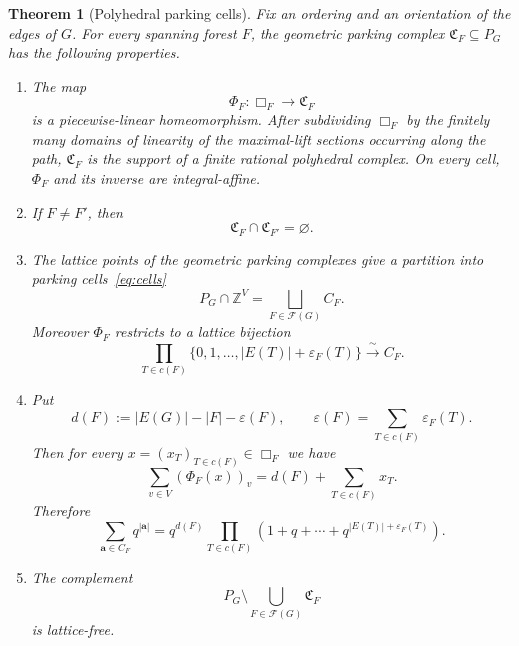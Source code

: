 \documentclass[10pt,a4paper]{amsart}
\newtheorem{theorem}{Theorem}
\newcommand{\ZZ}{\mathbb Z}
\newcommand{\ba}{\mathbf{a}}
\newcommand{\cF}{\mathcal{F}}    %
\newcommand{\eps}{\varepsilon}
\newcommand{\fC}{\mathfrak C}    %
\renewcommand{\mathcal}{\mathscr}
\begin{document}
\begin{theorem}
  [Polyhedral parking cells]
  \label{thm:polyhedral-parking-cells} Fix an ordering and an orientation of the edges of $G$.
For every spanning
forest $F$, the geometric parking complex $\fC_F\subseteq P_G$ has the following properties.
\begin{enumerate}
\item[(i)] The map
\[
   \Phi_F:\Box_F\longrightarrow\fC_F
\]
is a piecewise-linear homeomorphism.  After subdividing $\Box_F$ by
the finitely many domains of linearity of the maximal-lift sections occurring  along the path,
$\fC_F$ is the support of a finite rational polyhedral complex.
On every cell, $\Phi_F$ and its inverse are integral-affine.

\item[(ii)] If $F\ne F'$, then
\begin{equation}
   \fC_F\cap\fC_{F'}=\varnothing.
\label{eq:geometric-cells-disjoint}
\end{equation}

\item[(iii)] The lattice points of the geometric parking complexes give a partition into parking cells~\eqref{eq:cells}
\begin{equation}
   P_G\cap\ZZ^V
   =\bigsqcup_{F\in\cF(G)}C_F.
\label{eq:parking-lattice-partition}
\end{equation}
Moreover $\Phi_F$ restricts to a lattice bijection
\begin{equation}
   \prod_{T\in c(F)}
      \{0,1,\ldots,|E(T)|+\eps_F(T)\}
   \xrightarrow{\ \sim\ } C_F.
\label{eq:parking-chain-product}
\end{equation}

\item[(iv)] Put
\begin{equation}
   d(F):=|E(G)|-|F|-\eps(F),
   \qquad
   \eps(F)=\sum_{T\in c(F)}\eps_F(T).
\label{eq:parking-shift}
\end{equation}
Then for every $x=(x_T)_{T\in c(F)}\in\Box_F$ we have
\begin{equation}
   \sum_{v\in V}(\Phi_F(x))_v  = d(F)+\sum_{T\in c(F)}x_T.
\label{eq:parking-grading}
\end{equation}
Therefore
\begin{equation}
 \sum_{\ba\in C_F}q^{|\ba|} = q^{d(F)} \prod_{T\in c(F)}\left(1+q+\cdots+ q^{|E(T)|+\eps_F(T)}\right).
\label{eq:parking-cell-enumerator}
\end{equation}

\item[(v)] The complement
\begin{equation}
   P_G\setminus\bigcup_{F\in\cF(G)}\fC_F
\label{eq:lattice-free-complement}
\end{equation}
is lattice-free.
\end{enumerate}
\end{theorem}
\end{document}
